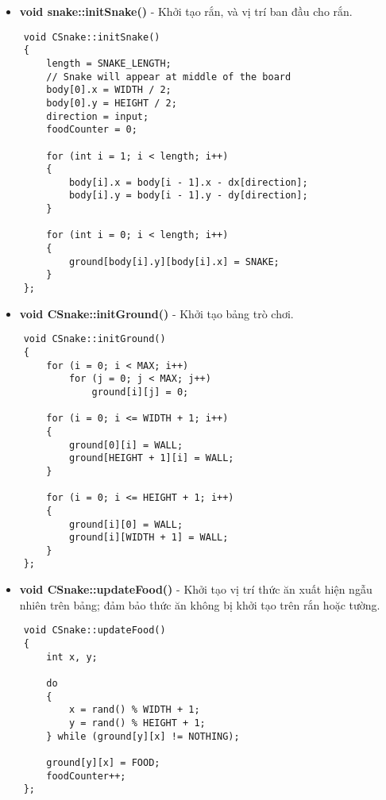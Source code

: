 \documentclass[a4paper, 12pt]{article}
\begin{document}
\vspace{2cm}

\begin{center}
    \begin{itemize}
        \item \textbf{void snake::initSnake()} - Khởi tạo rắn, và vị trí ban đầu cho rắn.
    \end{itemize}
    
    \begin{lstlisting}
    void CSnake::initSnake()
    {
        length = SNAKE_LENGTH;
        // Snake will appear at middle of the board
        body[0].x = WIDTH / 2;
        body[0].y = HEIGHT / 2;
        direction = input;
        foodCounter = 0;
    
        for (int i = 1; i < length; i++)
        {
            body[i].x = body[i - 1].x - dx[direction];
            body[i].y = body[i - 1].y - dy[direction];
        }
    
        for (int i = 0; i < length; i++)
        {
            ground[body[i].y][body[i].x] = SNAKE;
        }
    };
    \end{lstlisting}
\end{center}

\begin{center}
    \begin{itemize}
        \item \textbf{void CSnake::initGround()} - Khởi tạo bảng trò chơi.
    \end{itemize}
    
    \begin{lstlisting}
    void CSnake::initGround()
    {
        for (i = 0; i < MAX; i++)
            for (j = 0; j < MAX; j++)
                ground[i][j] = 0;
    
        for (i = 0; i <= WIDTH + 1; i++)
        {
            ground[0][i] = WALL;
            ground[HEIGHT + 1][i] = WALL;
        }
    
        for (i = 0; i <= HEIGHT + 1; i++)
        {
            ground[i][0] = WALL;
            ground[i][WIDTH + 1] = WALL;
        }
    };
    \end{lstlisting}
\end{center}
\vspace{2cm}

\begin{center}
    \begin{itemize}
        \item \textbf{void CSnake::updateFood()} - Khởi tạo vị trí thức ăn xuất hiện ngẫu nhiên trên bảng; đảm bảo thức ăn không bị khởi tạo trên rắn hoặc tường.
    \end{itemize}
    
    \begin{lstlisting}
    void CSnake::updateFood()
    {
        int x, y;
    
        do
        {
            x = rand() % WIDTH + 1;
            y = rand() % HEIGHT + 1;
        } while (ground[y][x] != NOTHING);
    
        ground[y][x] = FOOD;
        foodCounter++;
    };
    \end{lstlisting}
\end{center}
\end{document}
